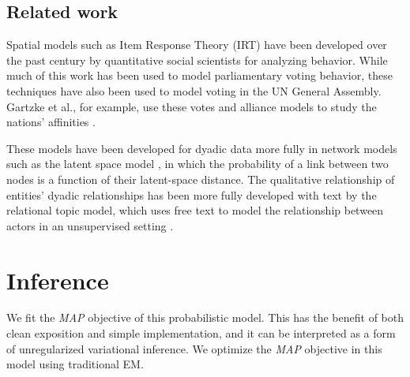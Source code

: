 
\subsection{Related work}

Spatial models such as Item Response Theory (IRT) have been developed
over the past century by quantitative social scientists for analyzing
behavior.  While much of this work has been used to model
parliamentary voting behavior, these techniques have also been used to
model voting in the UN General Assembly. Gartzke et al., for example,
use these votes and alliance models to study the nations' affinities
\cite{gartzke:1998}.

These models have been developed for dyadic data more fully in network
models such as the latent space model \cite{hoff:2002,sarkar:2005}, in
which the probability of a link between two nodes is a function of
their latent-space distance.  The qualitative relationship of
entities' dyadic relationships has been more fully developed with text
by the relational topic model, which uses free text to model the
relationship between actors in an unsupervised setting
\cite{chang:2009}.



\section{Inference}
We fit the \emph{MAP} objective of this probabilistic model.  This has
the benefit of both clean exposition and simple implementation, and it
can be interpreted as a form of unregularized variational inference.
We optimize the \emph{MAP} objective in this model using traditional
EM.

